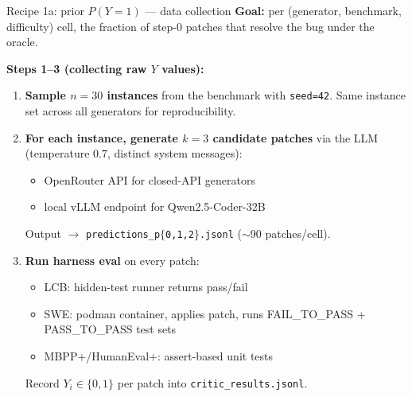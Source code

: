 \documentclass[10pt]{beamer}
\newcommand{\info}[1]{\textcolor{primaryBlue}{\textbf{#1}}}
\begin{document}
\begin{frame}{Recipe 1a: prior \textcolor{primaryBlue}{$P(Y{=}1)$} --- data collection}
\vspace{0.2cm}
\textbf{Goal:} per (generator, benchmark, difficulty) cell, the fraction of
step-0 patches that resolve the bug under the oracle.

\vspace{0.3cm}
\textbf{Steps 1--3 (collecting raw $Y$ values):}
\begin{enumerate}
\item \info{Sample $n=30$ instances} from the benchmark with \texttt{seed=42}.
  Same instance set across all generators for reproducibility.
\item \info{For each instance, generate $k=3$ candidate patches} via the LLM
  (temperature $0.7$, distinct system messages):
  \begin{itemize}
  \item OpenRouter API for closed-API generators
  \item local vLLM endpoint for Qwen2.5-Coder-32B
  \end{itemize}
  Output $\to$ \texttt{predictions\_p$\{$0,1,2$\}$.jsonl} ($\sim$90 patches/cell).
\item \info{Run harness eval} on every patch:
  \begin{itemize}
  \item LCB: hidden-test runner returns pass/fail
  \item SWE: podman container, applies patch, runs FAIL\_TO\_PASS +
    PASS\_TO\_PASS test sets
  \item MBPP+/HumanEval+: assert-based unit tests
  \end{itemize}
  Record $Y_i \in \{0, 1\}$ per patch into \texttt{critic\_results.jsonl}.
\end{enumerate}
\end{frame}
\end{document}

